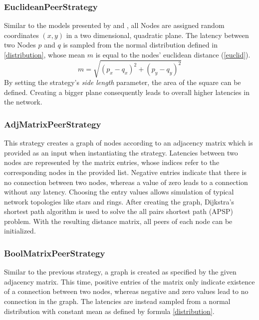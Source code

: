 \documentclass[a4paper,12pt,twoside]{report}
\begin{document}
\subsubsection{EuclideanPeerStrategy}
Similar to the models presented by \cite{mwalemodel} and \cite{selfishmine2}, all Nodes are assigned random coordinates $(x,y)$ in a two dimensional, quadratic plane. The latency between two Nodes $p$ and $q$ is sampled from the normal distribution defined in \autoref{distribution}, whose mean $m$ is equal to the nodes' euclidean distance (\autoref{euclid}).
\begin{equation}\label{euclid}
m = \sqrt{(p_{x}-q_{x})^{2}+(p_{y}-q_{y})^{2}}
\end{equation}
By setting the strategy's \textit{side length} parameter, the area of the square can be defined. Creating a bigger plane consequently leads to overall higher latencies in the network.
\subsubsection{AdjMatrixPeerStrategy}
This strategy creates a graph of nodes according to an adjacency matrix which is provided as an input when instantiating the strategy. Latencies between two nodes are represented by the matrix entries, whose indices refer to the corresponding nodes in the provided list. Negative entries indicate that there is no connection between two nodes, whereas a value of zero leads to a connection without any latency. Choosing the entry values allows simulation of typical network topologies like stars and rings. After creating the graph, Dijkstra's shortest path algorithm \cite{dijkstra} is used to solve the all pairs shortest path (APSP) problem. With the resulting distance matrix, all peers of each node can be initialized.
\subsubsection{BoolMatrixPeerStrategy}
Similar to the previous strategy, a graph is created as specified by the given adjacency matrix. This time, positive entries of the matrix only indicate existence of a connection between two nodes, whereas negative and zero values lead to no connection in the graph. The latencies are instead sampled from a normal distribution with constant mean as defined by formula \ref{distribution}.
\end{document}
